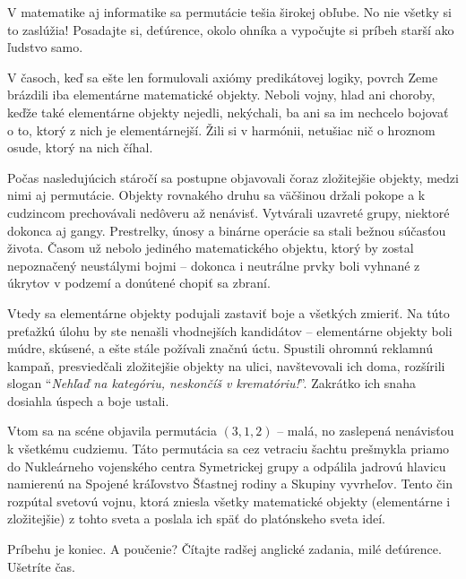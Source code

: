 





V matematike aj informatike sa permutácie tešia širokej obľube. No nie všetky si
to zaslúžia! Posadajte si, deťúrence, okolo ohníka a vypočujte si príbeh starší
ako ľudstvo samo.

V časoch, keď sa ešte len formulovali axiómy predikátovej logiky, povrch Zeme
brázdili iba elementárne matematické objekty. Neboli vojny, hlad ani choroby,
keďže také elementárne objekty nejedli, nekýchali, ba ani sa im nechcelo bojovať
o to, ktorý z nich je elementárnejší. Žili si v harmónii, netušiac nič o hroznom
osude, ktorý na nich číhal.

Počas nasledujúcich stáročí sa postupne objavovali čoraz zložitejšie objekty,
medzi nimi aj permutácie. Objekty rovnakého druhu sa väčšinou držali pokope a k
cudzincom prechovávali nedôveru až nenávisť. Vytvárali uzavreté grupy, niektoré
dokonca aj gangy. Prestrelky, únosy a binárne operácie sa stali bežnou súčasťou
života. Časom už nebolo jediného matematického objektu, ktorý by zostal
nepoznačený neustálymi bojmi -- dokonca i neutrálne prvky boli vyhnané z úkrytov
v podzemí a donútené chopiť sa zbraní.

Vtedy sa elementárne objekty podujali zastaviť boje a všetkých zmieriť. Na túto
preťažkú úlohu by ste nenašli vhodnejších kandidátov -- elementárne objekty boli
múdre, skúsené, a ešte stále požívali značnú úctu. Spustili ohromnú reklamnú
kampaň, presviedčali zložitejšie objekty na ulici, navštevovali ich doma,
rozšírili slogan ``\emph{Nehľaď na kategóriu, neskončíš v krematóriu!}''.
Zakrátko ich snaha dosiahla úspech a boje ustali.

Vtom sa na scéne objavila permutácia $(3,1,2)$ -- malá, no zaslepená nenávisťou
k všetkému cudziemu. Táto permutácia sa cez vetraciu šachtu prešmykla priamo do
Nukleárneho vojenského centra Symetrickej grupy a odpálila jadrovú hlavicu
namierenú na Spojené kráľovstvo Šťastnej rodiny a Skupiny vyvrheľov. Tento čin
rozpútal svetovú vojnu, ktorá zniesla všetky matematické objekty (elementárne i
zložitejšie) z tohto sveta a poslala ich späť do platónskeho sveta ideí.

Príbehu je koniec. A poučenie? Čítajte radšej anglické zadania, milé deťúrence.
Ušetríte čas.


